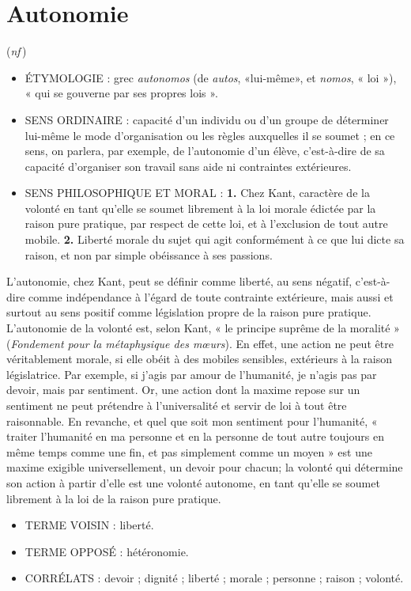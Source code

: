 
\chapter{Autonomie}

({\it nf}\,)

\begin{itemize}[leftmargin=1cm, label=, itemsep=1pt]
\item {\footnotesize ÉTYMOLOGIE} : grec {\it autonomos} (de
{\it autos}, «lui-même», et {\it nomos},
« loi »), « qui se gouverne par ses
propres lois ».
\item {\footnotesize SENS ORDINAIRE} : capacité d’un individu ou d'un
groupe de déterminer lui-même le
mode d'organisation ou les règles
auxquelles il se soumet ; en ce sens,
on parlera, par exemple, de l'autonomie d’un élève, c'est-à-dire de sa
capacité d'organiser son travail sans
aide ni contraintes extérieures.
\item {\footnotesize SENS PHILOSOPHIQUE ET MORAL} : {\bf 1.} Chez Kant, caractère de la
volonté en tant qu'elle se soumet
librement à la loi morale édictée par
la raison pure pratique, par respect
de cette loi, et à l'exclusion de tout
autre mobile.
{\bf 2.} Liberté morale du
sujet qui agit conformément à ce
que lui dicte sa raison, et non par
simple obéissance à ses passions.
\end{itemize}


L’autonomie, chez Kant, peut se définir
comme liberté, au sens négatif, c'est-à-dire comme indépendance à l'égard de
toute contrainte extérieure, mais aussi et
surtout au sens positif comme législation
propre de la raison pure pratique.
L'autonomie de la volonté est, selon
Kant, « le principe suprême de la moralité » ({\it Fondement pour la métaphysique
des mœurs}). En effet, une action ne peut
être véritablement morale, si elle obéit à
des mobiles sensibles, extérieurs à la raison législatrice. Par exemple, si j'agis par
amour de l'humanité, je n’agis pas par
devoir, mais par sentiment. Or, une
action dont la maxime repose sur un
sentiment ne peut prétendre à l’universalité et servir de loi à tout être raisonnable. En revanche, et quel que soit
mon sentiment pour l'humanité, « traiter
l'humanité en ma personne et en la personne de tout autre toujours en même
temps comme une fin, et pas simplement comme un moyen » est une
maxime exigible universellement, un
devoir pour chacun; la volonté qui
détermine son action à partir d’elle est
une volonté autonome, en tant qu'elle se
soumet librement à la loi de la raison
pure pratique.

\begin{itemize}[leftmargin=1cm, label=, itemsep=1pt]
\item {\footnotesize TERME VOISIN} : liberté.
\item {\footnotesize TERME OPPOSÉ} : hétéronomie.
\item {\footnotesize CORRÉLATS} : devoir ; dignité ; liberté ; morale ; personne ; raison ; volonté.
\end{itemize}


